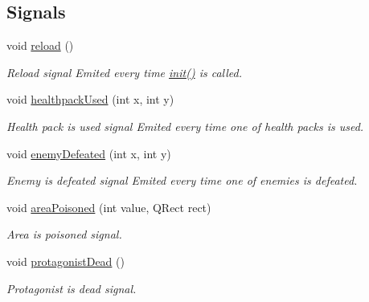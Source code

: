 \subsection*{Signals}
\begin{DoxyCompactItemize}
\item 
void \hyperlink{classWorldModel_a9ee97272fc756d45c411f578f98905af}{reload} ()\hypertarget{classWorldModel_a9ee97272fc756d45c411f578f98905af}{}\label{classWorldModel_a9ee97272fc756d45c411f578f98905af}

\begin{DoxyCompactList}\small\item\em Reload signal Emited every time \hyperlink{classWorldModel_a9003814b10d3b533d3c4313613712493}{init()} is called. \end{DoxyCompactList}\item 
void \hyperlink{classWorldModel_a1f403da0540ae3e4fe55ea7262ee2fe8}{healthpack\+Used} (int x, int y)
\begin{DoxyCompactList}\small\item\em Health pack is used signal Emited every time one of health packs is used. \end{DoxyCompactList}\item 
void \hyperlink{classWorldModel_af66c7d6051c21a0933e9ac168096dd8b}{enemy\+Defeated} (int x, int y)
\begin{DoxyCompactList}\small\item\em Enemy is defeated signal Emited every time one of enemies is defeated. \end{DoxyCompactList}\item 
void \hyperlink{classWorldModel_aceb49c5514940947dbcacc97484aa4bd}{area\+Poisoned} (int value, Q\+Rect rect)
\begin{DoxyCompactList}\small\item\em Area is poisoned signal. \end{DoxyCompactList}\item 
void \hyperlink{classWorldModel_a73bdac0d024fd7ae02f09b58e833cad3}{protagonist\+Dead} ()
\begin{DoxyCompactList}\small\item\em Protagonist is dead signal. \end{DoxyCompactList}\end{DoxyCompactItemize}
